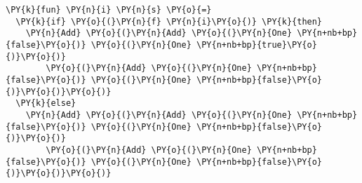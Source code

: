 {\small
\begin{Verbatim}[commandchars=\\\{\}]
\PY{k}{fun} \PY{n}{i} \PY{n}{s} \PY{o}{=}
  \PY{k}{if} \PY{o}{(}\PY{n}{f} \PY{n}{i}\PY{o}{)} \PY{k}{then}
    \PY{n}{Add} \PY{o}{(}\PY{n}{Add} \PY{o}{(}\PY{n}{One} \PY{n+nb+bp}{false}\PY{o}{)} \PY{o}{(}\PY{n}{One} \PY{n+nb+bp}{true}\PY{o}{)}\PY{o}{)}
        \PY{o}{(}\PY{n}{Add} \PY{o}{(}\PY{n}{One} \PY{n+nb+bp}{false}\PY{o}{)} \PY{o}{(}\PY{n}{One} \PY{n+nb+bp}{false}\PY{o}{)}\PY{o}{)}\PY{o}{)}
  \PY{k}{else}
    \PY{n}{Add} \PY{o}{(}\PY{n}{Add} \PY{o}{(}\PY{n}{One} \PY{n+nb+bp}{false}\PY{o}{)} \PY{o}{(}\PY{n}{One} \PY{n+nb+bp}{false}\PY{o}{)}\PY{o}{)}
        \PY{o}{(}\PY{n}{Add} \PY{o}{(}\PY{n}{One} \PY{n+nb+bp}{false}\PY{o}{)} \PY{o}{(}\PY{n}{One} \PY{n+nb+bp}{false}\PY{o}{)}\PY{o}{)}\PY{o}{)}
\end{Verbatim}
}